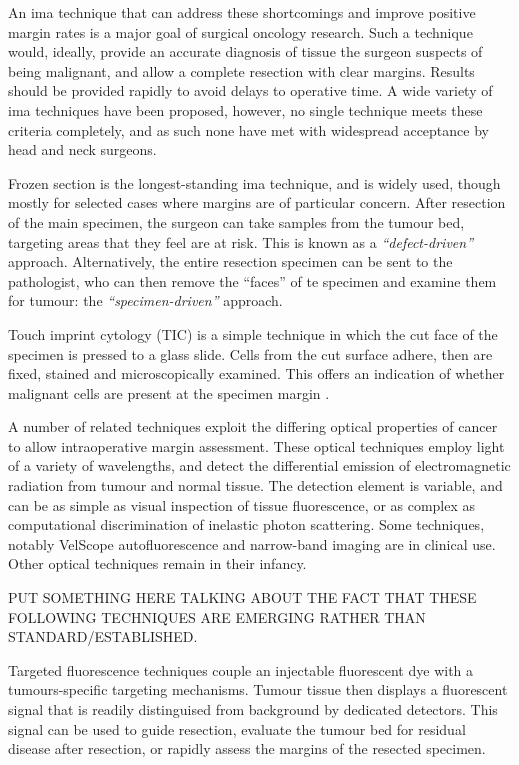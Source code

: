 An \gls{ima} technique that can address these shortcomings and improve positive margin rates is a major goal of surgical oncology research.
Such a technique would, ideally, provide an accurate diagnosis of tissue the surgeon suspects of being malignant, and allow a complete resection with clear margins.
Results should be provided rapidly to avoid delays to operative time.
A wide variety of \gls{ima} techniques have been proposed, however, no single technique meets these criteria completely, and as such none have met with widespread acceptance by head and neck surgeons.

Frozen section is the longest-standing \gls{ima} technique, and is widely used, though mostly for selected cases where margins are of particular concern.
After resection of the main specimen, the surgeon can take samples from the tumour bed, targeting  areas that they feel are at risk.
This is known as a \emph{``defect-driven''} approach.
Alternatively, the entire resection specimen can be sent to the pathologist, who can then remove the ``faces'' of te specimen and examine them for tumour: the \emph{``specimen-driven''} approach.

Touch imprint cytology (TIC) is a simple technique in which the cut face of the specimen is pressed to a glass slide. 
Cells from the cut surface adhere, then are fixed, stained and microscopically examined. 
This offers an indication of whether malignant cells are present at the specimen margin \cite{naveedDiagnosticAccuracyTouch2017}.

A number of related techniques exploit the differing optical properties of cancer to allow intraoperative margin assessment.
These optical techniques employ light of a variety of wavelengths, and detect the differential emission of electromagnetic radiation from tumour and normal tissue. 
The detection element is variable, and can be as simple as visual inspection of tissue fluorescence, or as complex as computational discrimination of inelastic photon scattering.
Some techniques, notably VelScope autofluorescence and narrow-band imaging are in clinical use.
Other optical techniques remain in their infancy.

PUT SOMETHING HERE TALKING ABOUT THE FACT THAT THESE FOLLOWING TECHNIQUES ARE EMERGING RATHER THAN STANDARD/ESTABLISHED.

Targeted fluorescence techniques couple an injectable fluorescent dye with a tumours-specific targeting mechanisms.
Tumour tissue then displays a fluorescent signal that is readily distinguised from background by dedicated detectors.
This signal can be used to guide resection, evaluate the tumour bed for residual disease after resection, or rapidly assess the margins of the resected specimen.

